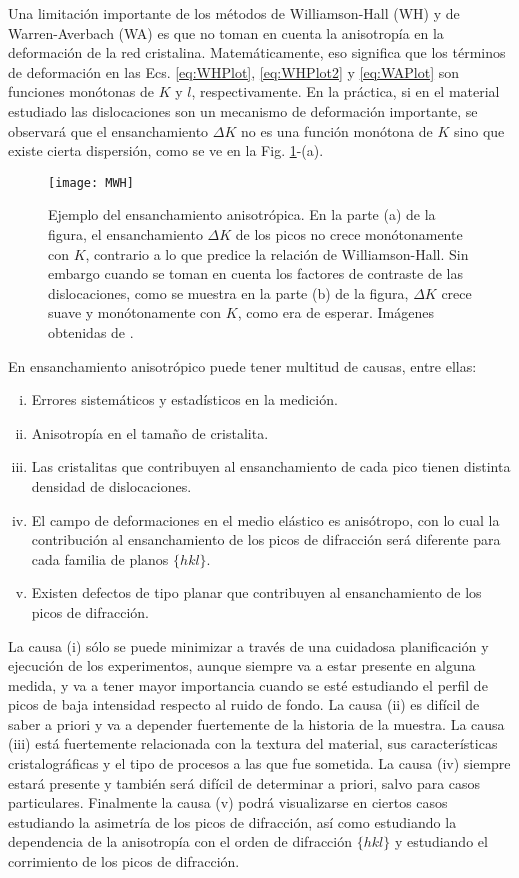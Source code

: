Una limitación importante de los métodos de Williamson-Hall (WH) y de Warren-Averbach (WA) es que no toman en cuenta la anisotropía en la deformación de la red cristalina. 
Matemáticamente, eso significa que los términos de deformación en las Ecs. \ref{eq:WHPlot}, \ref{eq:WHPlot2} y \ref{eq:WAPlot} son funciones monótonas de $K$ y $l$, respectivamente.
En la práctica, si en el material estudiado las dislocaciones son un mecanismo de deformación importante, se observará que el ensanchamiento $\Delta K$ no es una función monótona de $K$ sino que existe cierta dispersión, como se ve en la Fig. \ref{fig:MWH}-(a). 

\begin{figure}[!htb]
  \centering
  \texttt{[image: MWH]}
  \caption{Ejemplo del ensanchamiento anisotrópica. En la parte (a) de la figura, el ensanchamiento $\Delta K$ de los picos no crece monótonamente con $K$, contrario a lo que predice la relación de Williamson-Hall. Sin embargo cuando se toman en cuenta los factores de contraste de las dislocaciones, como se muestra en la parte (b) de la figura, $\Delta K$ crece suave y monótonamente con $K$, como era de esperar. Imágenes obtenidas de \cite{Ungar1999}.}
  \label{fig:MWH}
\end{figure}

En ensanchamiento anisotrópico puede tener multitud de causas, entre ellas:
\begin{enumerate}[(i)]
  \item Errores sistemáticos y estadísticos en la medición. 
  \item Anisotropía en el tamaño de cristalita.
  \item Las cristalitas que contribuyen al ensanchamiento de cada pico tienen distinta densidad de dislocaciones.
  \item El campo de deformaciones en el medio elástico es anisótropo, con lo cual la contribución al ensanchamiento de los picos de difracción será diferente para cada familia de planos $\{hkl\}$.
  \item Existen defectos de tipo planar que contribuyen al ensanchamiento de los picos de difracción.
\end{enumerate}

La causa (i) sólo se puede minimizar a través de una cuidadosa planificación y ejecución de los experimentos, aunque siempre va a estar presente en alguna medida, y va a tener mayor importancia cuando se esté estudiando el perfil de picos de baja intensidad respecto al ruido de fondo. 
La causa (ii) es difícil de saber a priori y va a depender fuertemente de la historia de la muestra. 
La causa (iii) está fuertemente relacionada con la textura del material, sus características cristalográficas y el tipo de procesos a las que fue sometida. 
La causa (iv) siempre estará presente y también será difícil de determinar a priori, salvo para casos particulares.
Finalmente la causa (v) podrá visualizarse en ciertos casos estudiando la asimetría de los picos de difracción, así como estudiando la dependencia de la anisotropía con el orden de difracción $\{hkl\}$ y estudiando el corrimiento de los picos de difracción.

